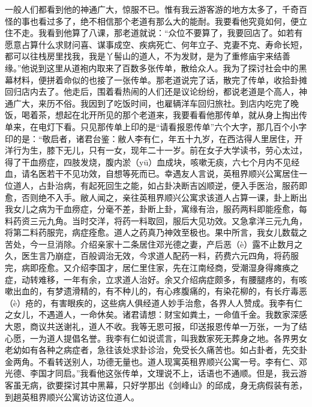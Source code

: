 \documentclass[12pt,UTF8]{ctexbook}
\begin{document}
一般人们都看到他的神通广大，惊服不已。惟有我云游客游的地方太多了，千奇百怪的事也看过多了，绝不相信那个老道有那么大的能耐。我要看他究竟如何，便立住不走。我看到他算了八课，那老道就说：“众位不要算了，我要回店了。如若有愿意占算什么求财问喜、谋事成空、疾病死亡、何年立子、克妻不克、寿命长短，都可以往栈房里找我，我是丫髻山的道人，不为发财，是为了重修庙宇来结善缘。”他说到这里从道袍内取来了百数多张传单，散给众人。我为了探讨社会中的黑幕材料，便拼着命似的也接了一张传单。那老道说完了话，散完了传单，收拾卦摊回归店内去了。他走后，围着看热闹的人们还是议论纷纷，都说老道是个高人，神通广大，来历不俗。我因到了吃饭时间，也雇辆洋车回归旅社。到店内吃完了晚饭，喝着茶，想起在北开所见的那个老道来，我要看看他那传单，就从身上掏出传单来，在电灯下看。只见那传单上印的是“请看报恩传单”六个大字，那几百个小字印的是：“敬启者，诸君台鉴：敝人李有仁，年五十九岁，在西沽得人里居住，开洋行为生，膝下无儿，只有一女，现年二十一岁。前在女子大学读书，劳心太过，得了干血痨症，四肢发烧，腹内淤（yū）血成块，咳嗽无痰，六七个月内不见经血，请名医若干不见功效，自想等死而已。幸遇友人言说，英租界顺兴公寓居住一位道人，占卦治病，有起死回生之能，如占卦决断吉凶顺逆，便入手医治，服药即愈，否则绝不入手。敝人闻之，亲往英租界顺兴公寓求该道人占算一课，卦上断出我女儿之病为干血痨症，分毫不差，卦断上卦，寓缘有治，服药两料即能痊愈，每料药资三元九角。当时交洋，将药一料取回，服后大见功效。又急拿洋三元九角，将第二料药服完，病症痊愈。道人之药真乃神效至极也。果中所言，我女儿数载之苦处，今一旦消除。介绍亲家十二条居住邓光德之妻，产后恶（è）露不止数月之久，医生言乃崩症，百般调治无效，今求道人配药一料，药费六元四角，将药服完，病即痊愈。又介绍李国才，居仁里住家，先在江南经商，受潮湿身得瘫痪之症，动转难移，一年有余，立求道人治好。余又介绍病症颇多，有腰腿疼的，有咳嗽出血的，有梦遗滑精的，有不种儿的，有心疼腹痛的，有染花柳的，有长疔毒恶（è）疮的，有害眼疾的，这些病人俱经道人妙手治愈，各界人人赞成。我李有仁之女儿，不遇道人，一命休矣。诸君请想：财宝如粪土，一命值千金。我数家深感大恩，商议共送谢礼，道人不收。我等无恩可报，印送报恩传单一万张，一为了结心愿，一为道人提倡名誉。我李有仁如说谎言，叫我数家死无葬身之地。各界男女老幼如有各种之病症者，急往该处求卦诊治，免受长久痛苦也。如占卦者，先交卦金两角。不看转送别人，功德无量也。道人现寓英租界顺兴公寓一号。李有仁、邓光德、李国才同启。”我看他这张传单，文理说不上，话语也不通顺。但是，我云游客虽无病，欲要探讨其中黑幕，只好学那出《剑峰山》的邱成，身无病假装有恙，到趟英租界顺兴公寓访访这位道人。
\end{document}
